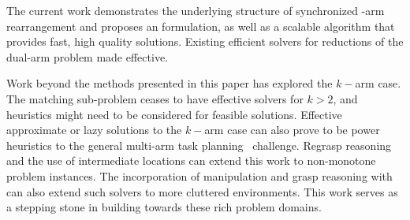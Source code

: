 The current work demonstrates the underlying structure of synchronized \dual-arm rearrangement and proposes an \milp formulation, as well as a scalable algorithm \algo that provides fast, high quality solutions. Existing efficient solvers for reductions of the dual-arm problem made \algo effective. 

\cameraready
{
Work beyond the methods presented in this paper has explored the $k-$arm case. The matching sub-problem ceases to have effective solvers for $k>2$, and heuristics might need to be considered for feasible solutions. Effective approximate or lazy solutions to the $k-$arm case can also prove to be power heuristics to the general multi-arm task planning~\cite{shome2019multiarm} challenge. Regrasp reasoning and the use of intermediate locations can extend this work to non-monotone problem instances. The incorporation of manipulation and grasp reasoning with  can also extend such solvers to more cluttered environments. This work serves as a stepping stone in building towards these rich problem domains.
}


